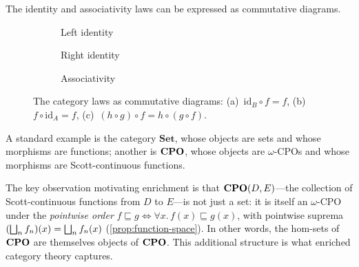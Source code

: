 \begin{remark}
The identity and associativity laws can be expressed as commutative diagrams.
\begin{figure}[h]
\centering
\begin{subfigure}[b]{0.3\textwidth}
\centering
{}
\caption{Left identity}
\end{subfigure}%
\hfill
\begin{subfigure}[b]{0.3\textwidth}
\centering
{}
\caption{Right identity}
\end{subfigure}%
\hfill
\begin{subfigure}[b]{0.3\textwidth}
\centering
{}
\caption{Associativity}
\end{subfigure}
\caption{The category laws as commutative diagrams: (a)~$\mathrm{id}_B \circ f = f$,
  (b)~$f \circ \mathrm{id}_A = f$, (c)~$(h \circ g) \circ f = h \circ (g \circ f)$.}
\label{fig:category-laws}
\end{figure}
\end{remark}


A standard example is the category $\mathbf{Set}$, whose objects are
sets and whose morphisms are functions; another is $\mathbf{CPO}$, whose objects
are $\omega$-CPOs and whose morphisms are Scott-continuous functions.

The key observation motivating enrichment is that $\mathbf{CPO}(D, E)$---the
collection of Scott-continuous functions from $D$ to $E$---is not just a
set: it is itself an $\omega$-CPO under the \emph{pointwise order}
$f \sqsubseteq g \iff \forall x.\, f(x) \sqsubseteq g(x)$, with
pointwise suprema $(\bigsqcup_n f_n)(x) = \bigsqcup_n f_n(x)$
(\cref{prop:function-space}). In
other words, the hom-sets of $\mathbf{CPO}$ are themselves objects of $\mathbf{CPO}$.
This additional structure is what enriched category theory captures.

